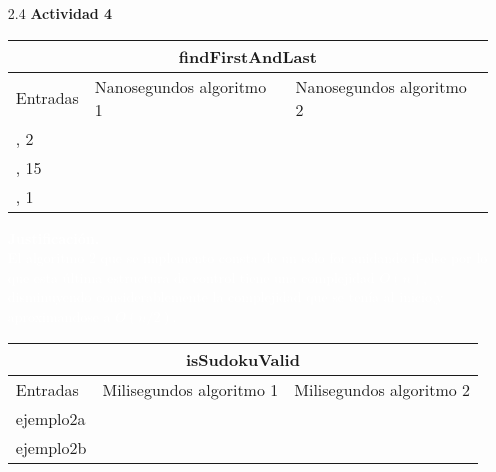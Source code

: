 \documentclass[a4paper,10pt]{article}
\begin{document}
\begin{enumerate}
    
    \item[2.4] \textbf{Actividad 4}
    \begin{table}[htb]
        \centering
        \begin{tabular}{|l|l|l|}
        \hline
        \multicolumn{3}{|c|}{findFirstAndLast} \\ \hline
        Entradas & Nanosegundos algoritmo 1 & Nanosegundos algoritmo 2 \\
        \hline \hline
        [1,4,2,1,6,2,9], 2 & \hspace{1.3cm}{$\approx 358$} & \hspace{1.3cm}{$\approx 202$} \\ \hline
        [4,2,7,5,4,3,7,2,5,3,4,1], 15 &  \hspace{1.3cm}{$\approx 329$}& \hspace{1.3cm}{$\approx 197$} \\ \hline
        [3,2,1,4,2], 1 & \hspace{1.3cm}{$\approx 280$} & \hspace{1.3cm}{$\approx 307$} \\ \hline
        \end{tabular}
        \end{table}

        \begin{tcolorbox}[colback=black!20!black,colframe=cyan!85!black]
           \textcolor{white}{ \textbf{Justificación.\\}El algoritmo 2 que se implemento consta de un solo for anidando if-else por lo que esta última estructura de control tiene una complejidad $O(n)$,
                             disminuyendo considerablemente la complejidad que se tenía al inicio,y aproximandose a $O(n/2)$.}
          \end{tcolorbox}
        
       
          \begin{table}[htb]
            \centering
            \begin{tabular}{|l|l|l|}
            \hline
            \multicolumn{3}{|c|}{isSudokuValid} \\ \hline
            Entradas & Milisegundos algoritmo 1 & Milisegundos algoritmo 2 \\
            \hline \hline
            ejemplo2a & \hspace{1.3cm}{$\approx 38$} & \hspace{1.3cm}{$\approx 9$} \\ \hline
            ejemplo2b & \hspace{1.3cm}{$\approx 33$} & \hspace{1.3cm}{$\approx 8$} \\ \hline
            \end{tabular}
            \end{table}


\end{enumerate}
\end{document}
